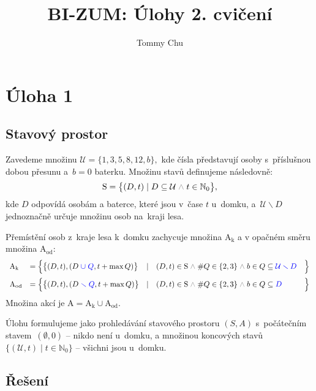\documentclass{article}
\title{BI-ZUM: Úlohy 2. cvičení}
\author{Tommy Chu}
\date{}
\newcommand{\Nz}{\mathbb{N}_0}
\newcommand{\U}{\mathcal{U}}
\newcommand{\mS}{\text{S}}
\newcommand{\A}{\text{A}}
\newcommand{\mand}{\;{\color{gray} \land}\;}
\begin{document}
    \maketitle

    \section*{Úloha 1}

    \subsection*{Stavový prostor}

    Zavedeme množinu
    \(
    \U = \{ 1, 3, 5, 8, 12, b \},
    \)
    kde čísla představují osoby s~příslušnou dobou přesunu a~$b = 0$ baterku.
    Množinu stavů definujeme následovně:
    \[
        \mS = \big\{
        (D, t) \mid D \subseteq \U \mand t \in \Nz
        \big\},
    \]
    kde $D$ odpovídá osobám a baterce, které jsou v~čase $t$ u~domku, a~$\U \smallsetminus D$ jednoznačně určuje množinu osob na~kraji lesa.

    Přemístění osob z~kraje lesa k~domku zachycuje množina $\A_\text{k}$
    a v opačném směru množina $\A_\text{od}$:
    \[
        \begin{array}{llllll}
            \A_\text{k}
            & = \Big\{
            \big\{ (D, t), (D {\color{blue} \;\cup\; Q}, t + \max Q) \big\}
            & \mid
            & (D, t) \in \mS \mand \# Q \in \{2, 3\}
            \mand b \in Q \subseteq  {\color{blue} \U\smallsetminus D}
            & \Big\}

            \\[3mm]

            \A_\text{od}
            & = \Big\{
            \big\{ (D, t), (D {\color{blue} \;\smallsetminus\; Q}, t + \max Q) \big\}
            & \mid
            & (D, t) \in \mS \mand \# Q \in \{2, 3\}
            \mand b \in Q \subseteq {\color{blue} D}
            & \Big\}
        \end{array}
    \]
    Množina akcí je $\A = \A_\text{k} \cup \A_\text{od}$.

    Úlohu formulujeme jako prohledávání stavového prostoru $(S, A)$ s~počátečním stavem~$(\emptyset, 0)$ -- nikdo není u~domku, a množinou koncových stavů~$\{ (\U, t) \mid t \in \Nz \}$ -- všichni jsou u~domku.

    \subsection*{Řešení}
\end{document}
